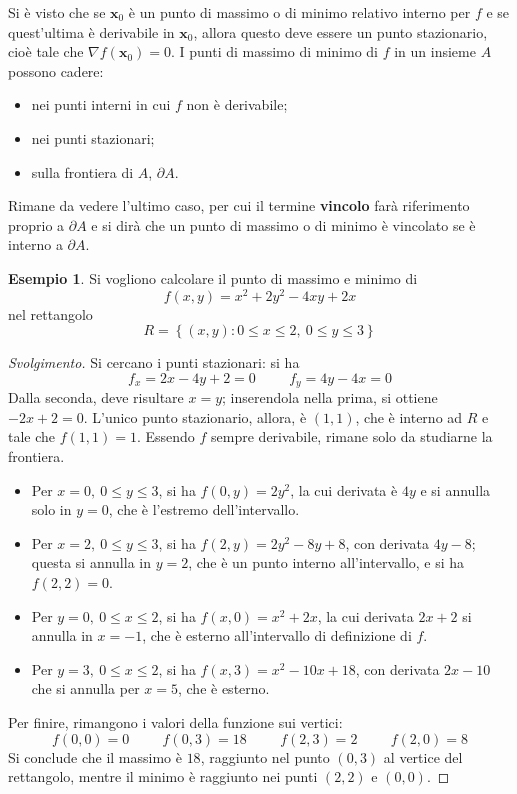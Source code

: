 \documentclass[10pt, a4paper]{scrartcl}
\newenvironment{svolgimento}{\renewcommand\qedsymbol{$\blacksquare$}\begin{proof}[Svolgimento]}{\end{proof}}
\theoremstyle{definition}
\newtheorem{esempio}{Esempio}
\numberwithin{esempio}{section}
\theoremstyle{definition}
\numberwithin{obs}{section}
\numberwithin{nota}{section}
\numberwithin{equation}{subsection}
\begin{document}
Si \`e visto che se $\mathbf{x}_0 $ \`e un punto di massimo o di minimo relativo interno per $f$ e se quest'ultima \`e derivabile in $\mathbf{x} _0$, allora questo deve essere un punto stazionario, cio\`e tale che $\nabla f(\mathbf{x} _0) = 0$.
I punti di massimo di minimo di $f$ in un insieme $A$ possono cadere:
\begin{itemize}
	\item nei punti interni in cui $f$ non \`e derivabile;
	\item nei punti stazionari;
	\item sulla frontiera di $A$, $\partial A$.
\end{itemize}
Rimane da vedere l'ultimo caso, per cui il termine \textbf{vincolo} far\`a riferimento proprio a $\partial A$ e si dir\`a che un punto di massimo o di minimo \`e vincolato se \`e interno a $\partial A$.
\begin{esempio}
	Si vogliono calcolare il punto di massimo e minimo di
	\[
	f(x,y) = x^2 + 2y^2 - 4xy + 2x
	\] 
	nel rettangolo 
	\[
	R = \left\{ (x,y) : 0\le x\le 2 , \ 0\le y \le 3 \right\} 
	\] 
	\begin{svolgimento}
		Si cercano i punti stazionari: si ha
		\[
		f_x = 2x - 4y + 2 = 0 \hspace{1cm}f_y = 4y -4x = 0
		\] 
		Dalla seconda, deve risultare $x=y$; inserendola nella prima, si ottiene $-2x + 2 =0$. 
		L'unico punto stazionario, allora, \`e $(1,1)$, che \`e interno ad $R$ e tale che $f(1,1) = 1$.
		Essendo $f$ sempre derivabile, rimane solo da studiarne la frontiera.
		\begin{itemize}
			\item Per $x = 0, \ 0\le y\le 3$, si ha $f(0,y) = 2y^2$, la cui derivata \`e $4y$ e si annulla solo in $y=0$, che \`e l'estremo dell'intervallo.
			\item Per $x=2, \ 0\le y\le 3$, si ha $f(2,y) = 2y^2 - 8y +8$, con derivata $4y-8$; questa si annulla in $y=2$, che \`e un punto interno all'intervallo, e si ha $f(2,2) = 0$.
			\item Per $y=0, \ 0\le x\le 2$, si ha $f(x,0) = x^2 + 2x$, la cui derivata $2x+2$ si annulla in $x=-1$, che \`e esterno all'intervallo di definizione di $f$.
			\item Per $y=3, \ 0\le x\le 2$, si ha $f(x,3) = x^2 -10x+18$, con derivata $2x-10$ che si annulla per $x=5$, che \`e esterno.
		\end{itemize}
		Per finire, rimangono i valori della funzione sui vertici:
		\[
		f(0,0) = 0 \hspace{1cm} f(0,3) = 18 \hspace{1cm} f(2,3) = 2 \hspace{1cm} f(2,0) = 8
		\] 
		Si conclude che il massimo \`e $18$, raggiunto nel punto $(0,3)$ al vertice del rettangolo, mentre il minimo \`e raggiunto nei punti $(2,2)$ e $(0,0)$.
	\end{svolgimento}
\end{esempio}
\end{document}
